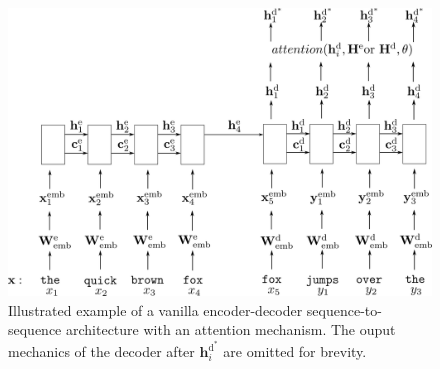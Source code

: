 \documentclass[11pt]{article}
\theoremstyle{definition}
\begin{document}
\begin{figure}[h]
	\includegraphics[width=\linewidth]{figures/vanilla-attention-big.png}
	\caption{Illustrated example of a vanilla encoder-decoder sequence-to-sequence architecture with an attention mechanism. The ouput mechanics of the decoder after $\mathbf{h}^{\text{d}^*}_i$ are omitted for brevity.}
	\label{fig:vanilla-attn}
\end{figure}
\end{document}
